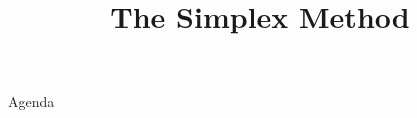 \documentclass[../main.tex]{subfiles}
\title{The Simplex Method}
\begin{document}
\begin{frame}
  \maketitle
\end{frame}


\begin{frame}{Agenda}
  \tableofcontents
\end{frame}









\begin{frame}
  \maketitle
\end{frame}
\end{document}

